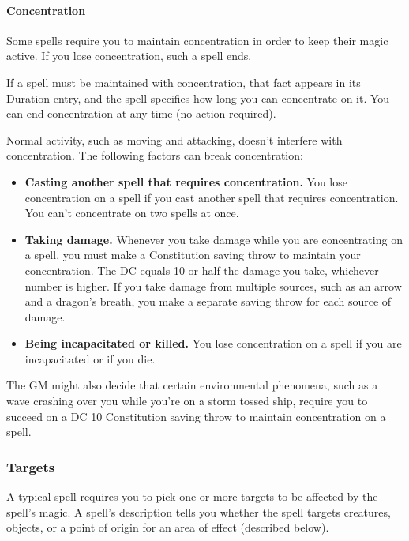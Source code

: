 \documentclass[
]{article}
\providecommand{\tightlist}{%
  \setlength{\itemsep}{0pt}\setlength{\parskip}{0pt}}
\begin{document}
\hypertarget{concentration}{%
\paragraph{Concentration}\label{concentration}}

Some spells require you to maintain concentration in order to keep their
magic active. If you lose concentration, such a spell ends.

If a spell must be maintained with concentration, that fact appears in
its Duration entry, and the spell specifies how long you can concentrate
on it. You can end concentration at any time (no action required).

Normal activity, such as moving and attacking, doesn't interfere with
concentration. The following factors can break concentration:

\begin{itemize}
\tightlist
\item
  \textbf{Casting another spell that requires concentration.} You lose
  concentration on a spell if you cast another spell that requires
  concentration. You can't concentrate on two spells at once.
\item
  \textbf{Taking damage.} Whenever you take damage while you are
  concentrating on a spell, you must make a Constitution saving throw to
  maintain your concentration. The DC equals 10 or half the damage you
  take, whichever number is higher. If you take damage from multiple
  sources, such as an arrow and a dragon's breath, you make a separate
  saving throw for each source of damage.
\item
  \textbf{Being incapacitated or killed.} You lose concentration on a
  spell if you are incapacitated or if you die.
\end{itemize}

The GM might also decide that certain environmental phenomena, such as a
wave crashing over you while you're on a storm tossed ship, require you
to succeed on a DC 10 Constitution saving throw to maintain
concentration on a spell.

\hypertarget{targets}{%
\subsubsection{Targets}\label{targets}}

A typical spell requires you to pick one or more targets to be affected
by the spell's magic. A spell's description tells you whether the spell
targets creatures, objects, or a point of origin for an area of effect
(described below).
\end{document}
